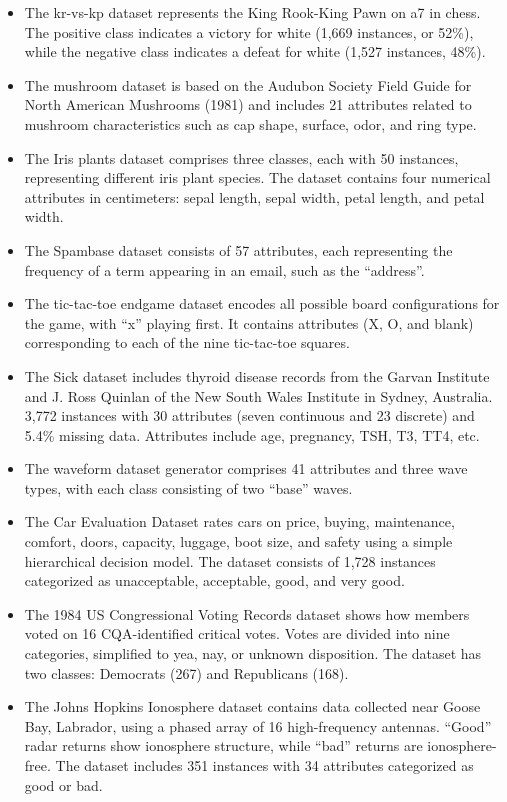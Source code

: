 \documentclass[sn-nature]{bst/sn-jnl}
\begin{document}
\begin{itemize}
    \item The kr-vs-kp dataset represents the King Rook-King Pawn on a7 in chess. The positive class indicates a victory for white (1,669 instances, or 52\%), while the negative class indicates a defeat for white (1,527 instances, 48\%).
    \item The mushroom dataset is based on the Audubon Society Field Guide for North American Mushrooms (1981) and includes 21 attributes related to mushroom characteristics such as cap shape, surface, odor, and ring type.
    \item The Iris plants dataset comprises three classes, each with 50 instances, representing different iris plant species. The dataset contains four numerical attributes in centimeters: sepal length, sepal width, petal length, and petal width.
    \item The Spambase dataset consists of 57 attributes, each representing the frequency of a term appearing in an email, such as the ``address''.
    \item The tic-tac-toe endgame dataset encodes all possible board configurations for the game, with ``x'' playing first. It contains attributes (X, O, and blank) corresponding to each of the nine tic-tac-toe squares.
    \item The Sick dataset includes thyroid disease records from the Garvan Institute and J. Ross Quinlan of the New South Wales Institute in Sydney, Australia. 3,772 instances with 30 attributes (seven continuous and 23 discrete) and 5.4\% missing data. Attributes include age, pregnancy, TSH, T3, TT4, etc.
    \item The waveform dataset generator comprises 41 attributes and three wave types, with each class consisting of two ``base'' waves.
    \item The Car Evaluation Dataset rates cars on price, buying, maintenance, comfort, doors, capacity, luggage, boot size, and safety using a simple hierarchical decision model. The dataset consists of 1,728 instances categorized as unacceptable, acceptable, good, and very good.
    \item The 1984 US Congressional Voting Records dataset shows how members voted on 16 CQA-identified critical votes. Votes are divided into nine categories, simplified to yea, nay, or unknown disposition. The dataset has two classes: Democrats (267) and Republicans (168).
    \item The Johns Hopkins Ionosphere dataset contains data collected near Goose Bay, Labrador, using a phased array of 16 high-frequency antennas. ``Good'' radar returns show ionosphere structure, while ``bad'' returns are ionosphere-free. The dataset includes 351 instances with 34 attributes categorized as good or bad.
\end{itemize}
\end{document}
